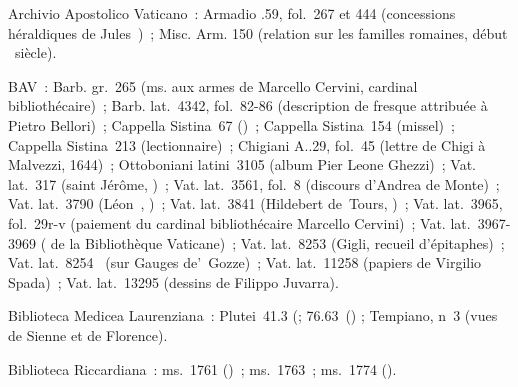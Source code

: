 \begin{teiElement}[name={TEI},change={commons\_edition}]
\begin{teiElement}[name={text},type={book},xmlid={book}]
\begin{teiElement}[name={group},type={book},xmlid={book-001}]
\begin{teiElement}[name={group},type={bibliography},data-page-title={Sources et bibliographie},data-include-href={Ch14\_Source\_bibliographie.xml},xmlid={bibliography-001}]
\begin{teiElement}[name={body}]
\begin{teiDiv}[type={section1},xmlid={section1-040}]
\begin{teiDiv}[type={section2},xmlid={section2-020}]
              \begin{teiBibl}[xmlid={bibl-013}]
Archivio Apostolico Vaticano : Armadio .59, fol. 267 et 444 (concessions héraldiques de Jules ) ; Misc. Arm.  150 (relation sur les familles romaines, début  siècle).
\end{teiBibl}
              \begin{teiBibl}[xmlid={bibl-014}]
BAV : Barb. gr. 265 (ms. aux armes de Marcello Cervini, cardinal bibliothécaire) ; Barb. lat. 4342, fol. 82-86 (description de fresque attribuée à Pietro Bellori) ; Cappella Sistina 67 () ; Cappella Sistina 154 (missel) ; Cappella Sistina 213 (lectionnaire) ; Chigiani A..29, fol. 45 (lettre de Chigi à Malvezzi, 1644) ; Ottoboniani latini 3105 (album Pier Leone Ghezzi) ; Vat. lat. 317 (saint Jérôme, ) ; Vat. lat. 3561, fol. 8 (discours d’Andrea de Monte) ; Vat. lat. 3790 (Léon , ) ; Vat. lat. 3841 (Hildebert de Tours, ) ; Vat. lat. 3965, fol. 29r-v (paiement du cardinal bibliothécaire Marcello Cervini) ; Vat. lat. 3967-3969 ( de la Bibliothèque Vaticane) ; Vat. lat. 8253 (Gigli, recueil d’épitaphes) ; Vat. lat. 8254  (sur Gauges de’ Gozze) ; Vat. lat. 11258 (papiers de Virgilio Spada) ; Vat. lat. 13295 (dessins de Filippo Juvarra).
\end{teiBibl}
            
\end{teiDiv}
            \begin{teiDiv}[type={section2},xmlid={section2-021}]

              \begin{teiBibl}[xmlid={bibl-015}]
Biblioteca Medicea Laurenziana : Plutei 41.3 (; 76.63 () ; Tempiano, n 3 (vues de Sienne et de Florence).
\end{teiBibl}
              \begin{teiBibl}[xmlid={bibl-016}]
Biblioteca Riccardiana : ms. 1761 () ; ms. 1763 ; ms. 1774 ().
\end{teiBibl}
            

\end{teiDiv}
\end{teiDiv}
\end{teiElement}
\end{teiElement}
\end{teiElement}
\end{teiElement}
\end{teiElement}
